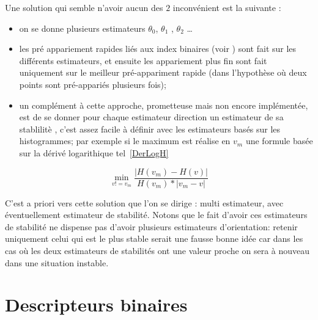 Une solution qui semble n'avoir aucun des $2$ inconv\'enient est la suivante :

\begin{itemize}
   \item on se donne plusieurs estimateurs $\theta_0$, $\theta_1$ , $\theta_2$ \dots 

   \item les pr\'e appariement rapides li\'es aux index binaires (voir \RefFantome)  sont
         fait sur les différents estimateurs, et ensuite les appariement plus fin sont
         fait uniquement sur le meilleur pr\'e-appariment rapide (dans l'hypoth\`ese o\`u
         deux points sont pr\'e-appari\'es  plusieurs fois);

   \item  un compl\'ement \`a cette approche, prometteuse mais non encore impl\'ement\'ee, est de se donner
          pour chaque estimateur  direction un estimateur de sa stablilit\`e , c'est assez facile
         \`a d\'efinir avec les estimateurs bas\'es sur les histogrammes; 
          par exemple si  le maximum est réalise en $v_m$ une formule bas\'ee sur la d\'eriv\'e logarithique
          tel~\ref{DerLogH}
\end{itemize}

\begin{equation}
    \min_{v!=v_m}\frac{|H(v_m)-H(v)|}{H(v_m)*|v_m-v|} \label{DerLogH}
\end{equation}

C'est a priori vers cette solution que l'on se dirige : multi estimateur, avec \'eventuellement estimateur
de stabilit\'e. Notons que le fait d'avoir ces estimateurs de stabilit\'e ne dispense pas d'avoir
plusieurs estimateurs d'orientation: retenir uniquement celui qui est le plus stable serait une fausse bonne id\'ee
car dans les cas o\`u les deux estimateurs de stabilit\'es ont une valeur proche on sera \`a 
nouveau dans une situation instable.


\section{Descripteurs binaires}

